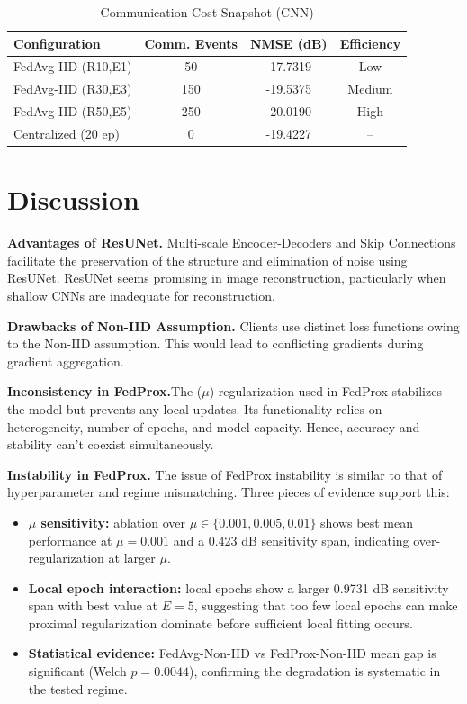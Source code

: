 \documentclass[runningheads]{llncs}
\begin{document}
\begin{table}[htbp]
\caption{Communication Cost Snapshot (CNN)}
\label{tab:comm}
\centering
\begin{tabular}{lccc}
\toprule
Configuration & Comm. Events & NMSE (dB) & Efficiency \\
\midrule
FedAvg-IID (R10,E1) & 50 & -17.7319 & Low \\
FedAvg-IID (R30,E3) & 150 & -19.5375 & Medium \\
FedAvg-IID (R50,E5) & 250 & -20.0190 & High \\
Centralized (20 ep) & 0 & -19.4227 & -- \\
\bottomrule
\end{tabular}
\end{table}


\section{Discussion}

\textbf{Advantages of ResUNet.} Multi-scale Encoder-Decoders and Skip Connections facilitate the preservation of the structure and elimination of noise using ResUNet. ResUNet seems promising in image reconstruction, particularly when shallow CNNs are inadequate for reconstruction.

\textbf{Drawbacks of Non-IID Assumption.} Clients use distinct loss functions owing to the Non-IID assumption. This would lead to conflicting gradients during gradient aggregation.

\textbf{Inconsistency in FedProx.}The ($\mu$) regularization  used in FedProx stabilizes the model but prevents any local updates. Its functionality relies on heterogeneity, number of epochs, and model capacity. Hence, accuracy and stability can’t coexist simultaneously.

\textbf{Instability in FedProx.} The issue of FedProx instability is similar to that of hyperparameter and regime mismatching. Three pieces of evidence support this:
\begin{itemize}
    \item \textbf{$\mu$ sensitivity:} ablation over $\mu\in\{0.001,0.005,0.01\}$ shows best mean performance at $\mu=0.001$ and a 0.423 dB sensitivity span, indicating over-regularization at larger $\mu$.
    \item \textbf{Local epoch interaction:} local epochs show a larger 0.9731 dB sensitivity span with best value at $E=5$, suggesting that too few local epochs can make proximal regularization dominate before sufficient local fitting occurs.
    \item \textbf{Statistical evidence:} FedAvg-Non-IID vs FedProx-Non-IID mean gap is significant (Welch $p=0.0044$), confirming the degradation is systematic in the tested regime.
\end{itemize}
\end{document}
